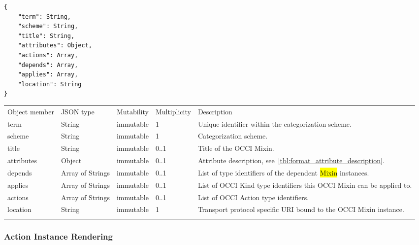 \documentclass[10pt,a4paper]{article}
\begin{document}
\begin{lstlisting}
{
    "term": String,
    "scheme": String,
    "title": String,
    "attributes": Object,
    "actions": Array,
    "depends": Array,
    "applies": Array,
    "location": String
}
\end{lstlisting}

 {
    \begin{tabularx}{\textwidth}{llllX}
    \toprule
    Object member   & JSON type         & Mutability  & Multiplicity  & Description \\
    \colrule
    term            & String            & immutable   & 1             & Unique identifier within the categorization scheme. \\

    scheme          & String            & immutable   & 1             & Categorization scheme. \\

    title           & String            & immutable   & 0..1          & Title of the OCCI Mixin. \\

    attributes      & Object            & immutable   & 0..1          & Attribute description, see~\ref{tbl:format_attribute_description}. \\

    depends         & Array of Strings  & immutable   & 0..1          & List of type identifiers of the dependent \hl{Mixin} instances. \\

    applies         & Array of Strings  & immutable   & 0..1          & List of OCCI Kind type identifiers this OCCI Mixin can be applied to. \\

    actions         & Array of Strings  & immutable   & 0..1          & List of OCCI Action type identifiers. \\

    location        & String            & immutable   & 1             & Transport protocol specific URI bound to the OCCI Mixin instance. \\
    \botrule
    \end{tabularx}
}

\subsubsection{Action Instance Rendering}
\label{sec:format_action}
\end{document}
